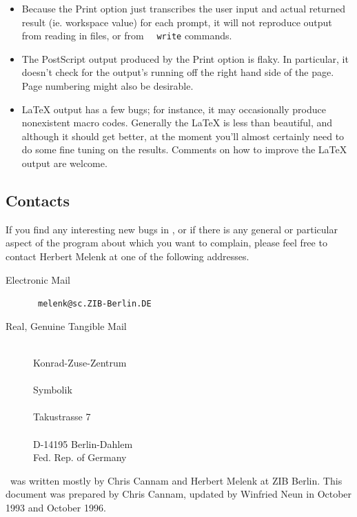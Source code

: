 \begin{itemize}
\item Because the Print option just transcribes the user input and
actual returned result (ie. workspace value) for each prompt, it will
not reproduce output from reading in files, or from \REDUCE\ {\tt
write} commands.

\item The PostScript output produced by the Print option is flaky.
In particular, it doesn't check for the output's running off the right
hand side of the page.  Page numbering might also be desirable.

\item \LaTeX{} output has a few bugs; for instance, it may
occasionally produce nonexistent macro codes.  Generally the \LaTeX{}
is less than beautiful, and although it should get better, at the
moment you'll almost certainly need to do some fine tuning on the
results.  Comments on how to improve the \LaTeX{} output are welcome.

\end{itemize}

\subsection{Contacts}

If you find any interesting new bugs in \xr , or if there is any
general or particular aspect of the program about which you want to
complain, please feel free to contact Herbert Melenk at one of the
following addresses.
\begin{description}

\item[Electronic Mail] \ {\tt melenk@sc.ZIB-Berlin.DE}
\item[Real, Genuine Tangible Mail] \
\\Konrad-Zuse-Zentrum \\
\\Symbolik\\
\\Takustrasse 7\\
\\D-14195 Berlin-Dahlem\\
Fed. Rep. of Germany

\end{description}

\xr\ was written mostly by Chris Cannam and Herbert Melenk at ZIB
Berlin.  This document was prepared by Chris Cannam, updated by Winfried Neun
in October 1993 and October 1996.



